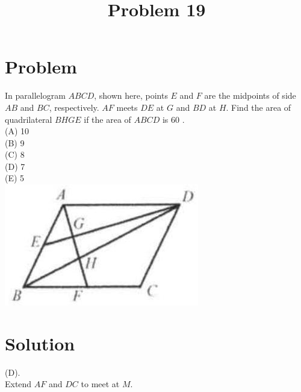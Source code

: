 \documentclass{article}
\title{Problem 19}
\date{}
\begin{document}
\maketitle

\section*{Problem}
In parallelogram \(A B C D\), shown here, points \(E\) and \(F\) are the midpoints of side \(A B\) and \(B C\), respectively. \(A F\) meets \(D E\) at \(G\) and \(B D\) at \(H\). Find the area of quadrilateral \(B H G E\) if the area of \(A B C D\) is 60 .\\
(A) 10\\
(B) 9\\
(C) 8\\
(D) 7\\
(E) 5\\
\centering
\includegraphics[width=\textwidth]{images/129(1).jpg}

\section*{Solution}
(D).\\
Extend \(A F\) and \(D C\) to meet at \(M\).
\end{document}

